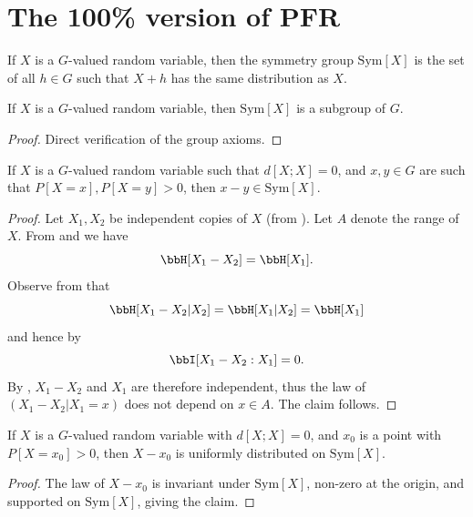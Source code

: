 \chapter{The 100\% version of PFR}

\begin{definition}\label{sym-group-def}
\leanok
If $X$ is a $G$-valued random variable, then the symmetry group $\mathrm{Sym}[X]$ is the set of all $h \in G$ such that $X +h$ has the same distribution as $X$.
\end{definition}

\begin{lemma}\label{sym-group}
\leanok
If $X$ is a $G$-valued random variable, then $\mathrm{Sym}[X]$ is a subgroup of $G$.
\end{lemma}

\begin{proof}\leanok Direct verification of the group axioms.
\end{proof}

\begin{lemma}\label{zero-large}
  \leanok  If $X$ is a $G$-valued random variable such that
  $d[X ;X]=0$, and $x,y \in G$ are such that $P[X=x], P[X=y]>0$, then $x-y \in \mathrm{Sym}[X]$.
\end{lemma}

\begin{proof}
  \leanok
   Let $X_1,X_2$ be independent copies of $X$ (from ). Let $A$ denote the range of $X$.  From  and  we have
  $$ \bbH[X_1-X_2] = \bbH[X_1].$$
Observe from  that
$$ \bbH[X_1-X_2|X_2] = \bbH[X_1|X_2] = \bbH[X_1]$$
and hence by 
$$ \bbI[X_1-X_2 : X_1] = 0.$$
By , $X_1-X_2$ and $X_1$ are therefore independent, thus the law of $(X_1-X_2|X_1=x)$ does not depend on $x \in A$. The claim follows.
\end{proof}

\begin{lemma}\label{sym-zero}
\leanok
  If $X$ is a $G$-valued random variable with $d[X ;X]=0$, and $x_0$ is a point with $P[X=x_0] > 0$, then $X-x_0$ is uniformly distributed on $\mathrm{Sym}[X]$.
\end{lemma}

\begin{proof}\leanok  The law of $X-x_0$ is invariant under $\mathrm{Sym}[X]$, non-zero at the origin, and supported on  $\mathrm{Sym}[X]$, giving the claim.
\end{proof}


